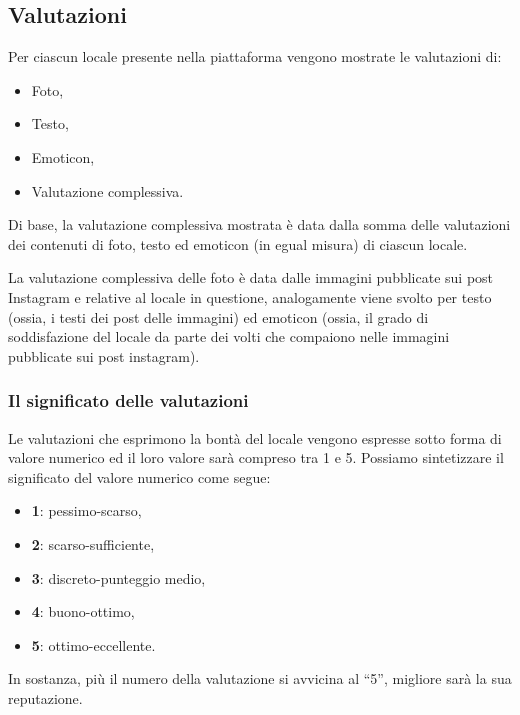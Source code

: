 \subsection{Valutazioni}

Per ciascun locale presente nella piattaforma vengono mostrate le valutazioni di:

\begin{itemize}
\item Foto,
\item Testo,
\item Emoticon,
\item Valutazione complessiva.
\end{itemize}

Di base, la valutazione complessiva mostrata è data dalla somma delle valutazioni dei contenuti di foto, testo ed emoticon (in egual misura) di ciascun locale.

La valutazione complessiva delle foto è data dalle immagini pubblicate sui post Instagram e relative al locale in questione, analogamente viene svolto per testo (ossia, i testi dei post delle immagini) ed emoticon (ossia, il grado di soddisfazione del locale da parte dei volti che compaiono nelle immagini pubblicate sui post instagram).

\subsubsection{Il significato delle valutazioni}

Le valutazioni che esprimono la bontà del locale vengono espresse sotto forma di valore numerico ed il loro valore sarà compreso tra 1 e 5. Possiamo sintetizzare il significato del valore numerico come segue:

\begin{itemize}
\item \textbf{1}: pessimo-scarso,
\item \textbf{2}: scarso-sufficiente,
\item \textbf{3}: discreto-punteggio medio,
\item \textbf{4}: buono-ottimo,
\item \textbf{5}: ottimo-eccellente.
\end{itemize}

In sostanza, più il numero della valutazione si avvicina al “5”, migliore sarà la sua reputazione.


